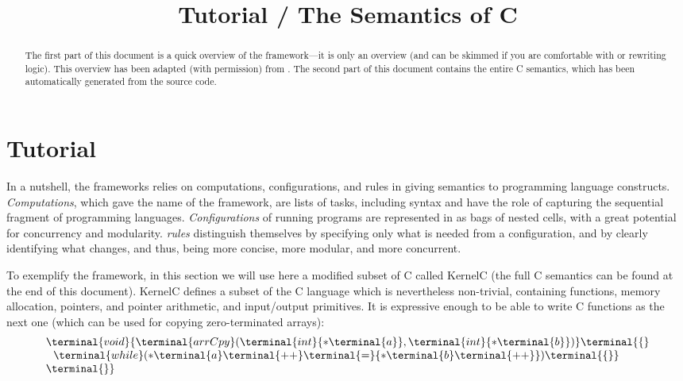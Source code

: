 \documentclass{article}
\title{\K Tutorial \slash{} The Semantics of C}
\begin{document}
\maketitle

\begin{abstract}The first part of this document is a quick overview of the \K framework---it is only an overview (and can be skimmed if you are comfortable with \K or rewriting logic).  This overview has been adapted (with permission) from \citet{serbanuta-2010-thesis}.  The second part of this document contains the entire C semantics, which has been automatically generated from the source code.
\end{abstract}

\section{\K Tutorial}
In a nutshell, the \K frameworks relies on computations, configurations, and \K rules in giving semantics to programming language constructs.  
{\em Computations}, which gave the name of the framework, are lists of tasks, including syntax and have the role of capturing the sequential fragment of programming languages.  {\em Configurations} of running programs are represented in \K as bags of nested cells, with a great potential for concurrency and modularity.  {\em \K rules} distinguish themselves by specifying only what is needed from a configuration, and by clearly identifying what changes, and thus, being more concise, more modular, and more concurrent.

To exemplify the \K framework, in this section we will use here a modified subset of C called {\sc KernelC} (the full C semantics can be found at the end of this document).   {\sc KernelC} defines a subset of the C language which is nevertheless non-trivial, containing functions, memory allocation, pointers, and pointer arithmetic, and input/output primitives.  It is expressive enough to be able to write C functions as the next one (which can be used for copying zero-terminated arrays):
\[\begin{array}{l}
\terminal{void}
{
  {\terminal{arrCpy}
  }
  (\terminal{int}{
    \ast\terminal{a}
    }, \terminal{int}{
     \ast\terminal{b}
     }
     ) }
     \terminal{\{} \\
     \ \ \terminal{while}   (
     {  
       {\ast\terminal{a}}
       \terminal{++}
     }\terminal{=}
     {
     {\ast\terminal{b}}
     \terminal{++}
     }
     )\terminal{\{\}} 
   \\ \terminal{\}}
   \end{array}\]
   
\end{document}
